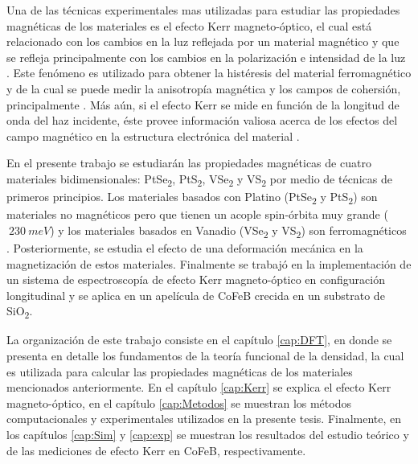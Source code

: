\newline 
\par Una de las t\'ecnicas experimentales mas utilizadas para estudiar las propiedades magn\'eticas de los materiales es el efecto Kerr magneto-\'optico, el cual est\'a relacionado con los cambios en la luz reflejada por un material magn\'etico y que se refleja principalmente con los cambios en la polarizaci\'on e intensidad de la luz \cite{MOp-1997}. Este fenómeno es utilizado para obtener la hist\'eresis del material ferromagn\'etico y de la cual se puede medir la anisotrop\'ia magn\'etica y los campos de cohersi\'on, principalmente \cite{MOp-2008}. M\'as a\'un, si el efecto Kerr se mide en funci\'on de la longitud de onda del haz incidente, \'este provee informaci\'on valiosa acerca de los efectos del campo  magn\'etico en la estructura electr\'onica del material \cite{MOp-1997}.
\newline
\par En el presente trabajo se estudiar\'an las propiedades magn\'eticas de cuatro materiales bidimensionales: PtSe\textsubscript{2}, PtS\textsubscript{2}, VSe\textsubscript{2} y VS\textsubscript{2} por medio de t\'ecnicas de primeros principios. Los materiales basados con Platino (PtSe\textsubscript{2} y PtS\textsubscript{2}) son materiales no magn\'eticos pero que tienen un acople spin-\'orbita muy grande ($~230~meV$) \cite{tmds-2016, PhysRevB.103.125409} y los materiales basados en Vanadio  (VSe\textsubscript{2} y VS\textsubscript{2}) son ferromagn\'eticos \cite{tmds-2016}. Posteriormente, se estudia el efecto de una deformación mec\'anica en la magnetizaci\'on de estos materiales. Finalmente se trabaj\'o en la implementaci\'on de un sistema de espectroscop\'ia de efecto Kerr magneto-\'optico en configuraci\'on longitudinal y se aplica en un apel\'icula de CoFeB crecida en un substrato de SiO\textsubscript{2}.
\newline
\par La organizaci\'on de este trabajo consiste en el cap\'itulo \ref{cap:DFT}, en donde se presenta en detalle los fundamentos de la teor\'ia funcional de la densidad, la cual es utilizada para calcular las propiedades magn\'eticas de los materiales mencionados anteriormente. En el cap\'itulo \ref{cap:Kerr} se explica el efecto Kerr magneto-\'optico, en el cap\'itulo \ref{cap:Metodos} se muestran los m\'etodos computacionales y experimentales utilizados en la presente tesis. Finalmente, en los cap\'itulos \ref{cap:Sim} y \ref{cap:exp} se muestran los resultados del estudio te\'orico y de las mediciones de efecto Kerr en CoFeB, respectivamente. 
